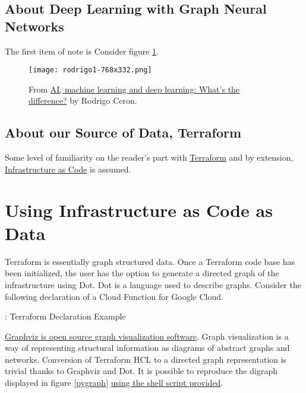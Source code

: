 \subsection{\label{sec:DL}About Deep Learning with Graph Neural Networks}

\justifying
The first item of note is Consider figure \ref{aimldl}.
\vspace{2mm}

\begin{figure}[H]
	\texttt{[image: rodrigo1-768x332.png]}
	\caption{From \href{https://www.ibm.com/blogs/systems/ai-machine-learning-and-deep-learning-whats-the-difference/}{AI, machine learning and deep learning: What’s the difference?} by Rodrigo Ceron.}
	\label{aimldl}
\end{figure}

\subsection{\label{sec:terraform}About our Source of Data, Terraform}

\justifying
Some level of familiarity on the reader's part with \href{https://www.terraform.io/intro/index.html}{Terraform} and
by extension, \href{https://learn.hashicorp.com/tutorials/terraform/infrastructure-as-code}{Infrastructure as Code} is
assumed. 
\vspace{2mm}

\section{\label{sec:collection}Using Infrastructure as Code as Data}

\justifying
Terraform is essentially graph structured data. Once a Terraform code base has been initialized, the user has the option to generate
a directed graph of the infrastructure using Dot. Dot is a language used to describe graphs. Consider the following declaration of a
Cloud Function for Google Cloud.

\begin{mybox}{\thetcbcounter: Terraform Declaration Example}
    
\end{mybox}

\justifying
\href{https://graphviz.org/}{Graphviz is open source graph visualization software}. Graph visualization is a way
of representing structural information as diagrams of abstract graphs and networks. 
Conversion of Terraform HCL to a directed graph representation is trivial thanks to Graphviz and Dot. It is possible to reproduce the
digraph displayed in figure \ref{pygraph} \href{https://github.com/devsecfranklin/model-graph-neural-net/blob/main/paper/code/gen_graph.sh}{using the shell script provided}.


